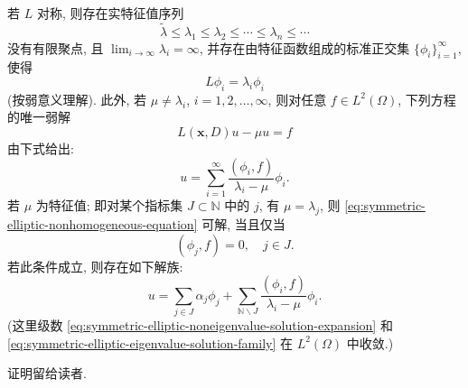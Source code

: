 \begin{Theorem}
\label{thm:symmetric-elliptic-eigenfunction-expansions}
若 $L$ 对称, 则存在实特征值序列
\begin{equation}\label{eq:symmetric-elliptic-eigenvalue-sequence}
\widetilde\lambda\leq\lambda_1\leq\lambda_2\leq\cdots\leq\lambda_n\leq\cdots
\end{equation}
没有有限聚点, 且 $\lim_{i\to\infty}\lambda_i=\infty$, 并存在由特征函数组成的标准正交集 $\{\phi_i\}_{i=1}^\infty$, 使得
\begin{equation}\label{eq:symmetric-elliptic-eigenfunction-equations}
L\phi_i=\lambda_i\phi_i
\end{equation}
(按弱意义理解). 此外, 若 $\mu\ne\lambda_i$, $i=1,2,\ldots,\infty$, 则对任意 $f\in L^2(\Omega)$, 下列方程的唯一弱解
\begin{equation}\label{eq:symmetric-elliptic-nonhomogeneous-equation}
L(\bm{x},D)u-\mu u=f
\end{equation}
由下式给出:
\begin{equation}\label{eq:symmetric-elliptic-noneigenvalue-solution-expansion}
u=\sum_{i=1}^\infty\dfrac{(\phi_i,f)}{\lambda_i-\mu}\phi_i.
\end{equation}
若 $\mu$ 为特征值; 即对某个指标集 $J\subset\mathbb{N}$ 中的 $j$, 有 $\mu=\lambda_j$, 则 \eqref{eq:symmetric-elliptic-nonhomogeneous-equation} 可解, 当且仅当
\begin{equation}\label{eq:symmetric-elliptic-eigenvalue-compatibility}
(\phi_j,f)=0,\quad j\in J.
\end{equation}
若此条件成立, 则存在如下解族:
\begin{equation}\label{eq:symmetric-elliptic-eigenvalue-solution-family}
u=\sum_{j\in J}\alpha_j\phi_j+\sum_{\mathbb{N}\backslash J}\dfrac{(\phi_i,f)}{\lambda_i-\mu}\phi_i.
\end{equation}
(这里级数 \eqref{eq:symmetric-elliptic-noneigenvalue-solution-expansion} 和 \eqref{eq:symmetric-elliptic-eigenvalue-solution-family} 在 $L^2(\Omega)$ 中收敛.)
\end{Theorem}

证明留给读者.
